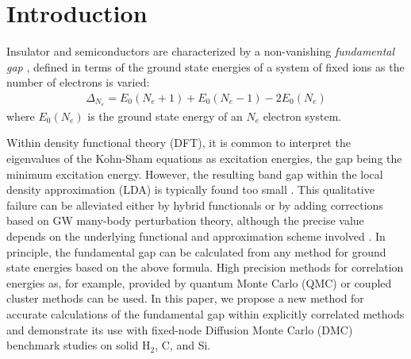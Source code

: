 \newcommand \beq{\begin{eqnarray}}
\newcommand \eeq{\end{eqnarray}}
\newcommand \bea{\begin{eqnarray}}
\newcommand \eea{\end{eqnarray}}
\newcommand \avec{{\bf a}}
\newcommand \kvec{{\bf k}}
\newcommand \lvec{{\bf l}}
\newcommand \qvec{{\bf q}}
\newcommand \pvec{{\bf p}}
\newcommand \hvec{{\bf h}}
\newcommand \nvec{{\bf n}}
\newcommand \xvec{{\bf x}}
\newcommand\rvec{{\bf r}}
\newcommand\yvec{{\bf y}}
\newcommand\Rvec{{\bf R}}
\newcommand\Pvec{{\bf P}}
\newcommand\Qvec{{\bf Q}}
\newcommand\Gvec{{\bf G}}
\newcommand\Kvec{{\bf K}}
\def\simge{\mathrel{%
       \rlap{\raise 0.511ex \hbox{$>$}}{\lower 0.511ex \hbox{$\sim$}}}}
\def\simle{\mathrel{
       \rlap{\raise 0.511ex \hbox{$<$}}{\lower 0.511ex \hbox{$\sim$}}}}

\section{Introduction}
Insulator and semiconductors are characterized by a non-vanishing {\it fundamental gap}
\cite{book}, 
defined in terms of the ground state energies of a system of fixed ions as the number of electrons is varied:
\beq
\Delta_{N_e} = E_0(N_e+1)+ E_0(N_e-1)- 2 E_0(N_e)
\label{gap}
\eeq
where $E_0(N_e)$ is the ground state energy of an $N_e$ electron system.

Within density functional theory (DFT), it is common to interpret the eigenvalues of the
Kohn-Sham equations as excitation energies, the gap being the minimum excitation energy. However, the resulting band gap
within the local density approximation (LDA) is typically found too small \cite{Perdew}.
This qualitative failure can be alleviated
either by hybrid functionals or by adding corrections based on GW many-body perturbation theory,
although the precise value depends on the underlying functional and approximation scheme involved \cite{book}.
In principle, the fundamental gap can be calculated from any method for ground state energies
based on the above formula.
High precision methods for correlation energies as, for example, provided
by quantum Monte Carlo (QMC) \cite{rev1,rev2,rev3,Ruggeri18} or coupled cluster methods
\cite{Shepherd13,Gruber18} can be used.  
In this paper, we propose a new method for accurate calculations of the fundamental gap
within explicitly correlated methods and demonstrate its use with fixed-node Diffusion Monte Carlo (DMC) benchmark studies on solid H$_2$,  C, and Si.

